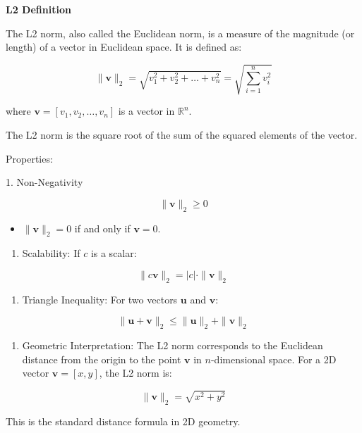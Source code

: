 \documentclass[
  letterpaper,
  DIV=11,
  numbers=noendperiod]{scrreprt}
\providecommand{\tightlist}{%
  \setlength{\itemsep}{0pt}\setlength{\parskip}{0pt}}\usepackage{longtable,booktabs,array}
\begin{document}
\begin{tcolorbox}[enhanced jigsaw, rightrule=.15mm, breakable, left=2mm, colframe=quarto-callout-tip-color-frame, opacityback=0, leftrule=.75mm, toprule=.15mm, colback=white, arc=.35mm, bottomrule=.15mm]

\textbf{L2 Definition}\vspace{2mm}

The L2 norm, also called the Euclidean norm, is a measure of the
magnitude (or length) of a vector in Euclidean space. It is defined as:

\[
\|\mathbf{v}\|_2 = \sqrt{v_1^2 + v_2^2 + \dots + v_n^2} = \sqrt{\sum_{i=1}^n v_i^2}
\]

where \(\mathbf{v} = [v_1, v_2, \dots, v_n]\) is a vector in
\(\mathbb{R}^n\).

The L2 norm is the square root of the sum of the squared elements of the
vector.

Properties:

1. Non-Negativity

\[
\|\mathbf{v}\|_2 \geq 0
\]

\begin{itemize}
\tightlist
\item
  \(\|\mathbf{v}\|_2 = 0\) if and only if \(\mathbf{v} = 0\).
\end{itemize}

\begin{enumerate}
\def\labelenumi{\arabic{enumi}.}
\setcounter{enumi}{1}
\tightlist
\item
  Scalability: If \(c\) is a scalar:
\end{enumerate}

\[
\|c \mathbf{v}\|_2 = |c| \cdot \|\mathbf{v}\|_2
\]

\begin{enumerate}
\def\labelenumi{\arabic{enumi}.}
\setcounter{enumi}{2}
\tightlist
\item
  Triangle Inequality: For two vectors \(\mathbf{u}\) and
  \(\mathbf{v}\):
\end{enumerate}

\[
\|\mathbf{u} + \mathbf{v}\|_2 \leq \|\mathbf{u}\|_2 + \|\mathbf{v}\|_2
\]

\begin{enumerate}
\def\labelenumi{\arabic{enumi}.}
\setcounter{enumi}{3}
\tightlist
\item
  Geometric Interpretation: The L2 norm corresponds to the Euclidean
  distance from the origin to the point \(\mathbf{v}\) in
  \(n\)-dimensional space. For a 2D vector \(\mathbf{v} = [x, y]\), the
  L2 norm is:
\end{enumerate}

\[
\|\mathbf{v}\|_2 = \sqrt{x^2 + y^2}
\]

This is the standard distance formula in 2D geometry.

\end{tcolorbox}
\end{document}
